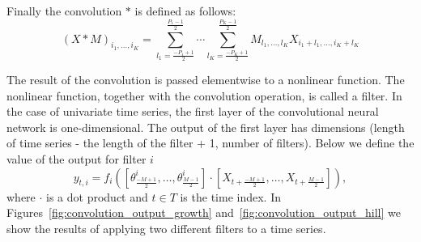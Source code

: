 \documentclass[a4paper,11pt,twoside]{report}
\theoremstyle{definition}
\begin{document}
Finally the convolution $*$ is defined as follows:
$$(X*M)_{i_1, \dots, i_K} = \sum_{l_1=\frac{-P_1+1}{2}}^{\frac{P_1-1}{2}} \cdots \sum_{l_K=\frac{-P_K+1}{2}}^{\frac{P_K-1}{2}} M_{l_1, \dots, l_K} X_{i_1 + l_1, \dots, i_K + l_K}$$

The result of the convolution is passed elementwise to a nonlinear function. The nonlinear function, together with the convolution operation, is called a filter.
In the case of univariate time series, the first layer of the convolutional neural network is one-dimensional. The output of the first layer has dimensions (length of time series - the length of the filter + 1, number of filters). Below we define the value of the output for filter $i$
$$ y_{t, i} = f_i([\theta_{\frac{-M+1}{2}}^i, \dots , \theta_{\frac{M-1}{2}}^i] \cdot [X_{t+\frac{-M+1}{2}}, \dots, X_{t+\frac{M-1}{2}}]),$$
where $\cdot$ is a dot product and $t \in T$ is the time index.
In Figures~\ref{fig:convolution_output_growth} and~\ref{fig:convolution_output_hill} we show the results of applying two different filters to a time series.


\FloatBarrier
\end{document}
